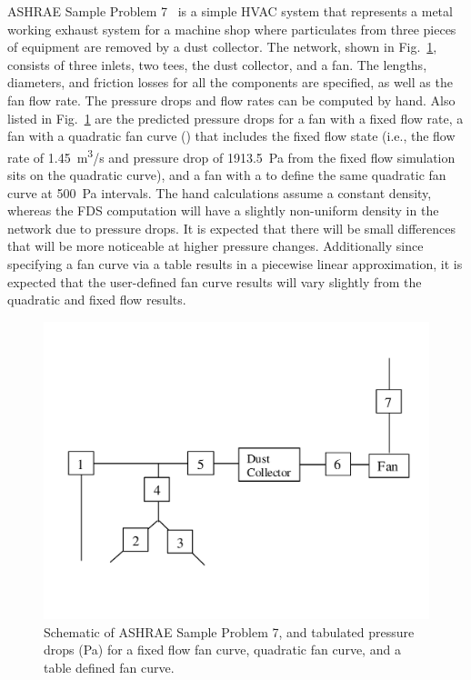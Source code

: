 \documentclass[11pt]{book}
\begin{document}
ASHRAE Sample Problem 7~\cite{ASHRAE} is a simple HVAC system that represents a metal working exhaust system for a machine shop where particulates from three pieces of equipment are removed by a dust collector.  The network, shown in Fig.~\ref{ASHRAE7}, consists of three inlets, two tees, the dust collector, and a fan.  The lengths, diameters, and friction losses for all the components are specified, as well as the fan flow rate. The pressure drops and flow rates can be computed by hand.  Also listed in Fig.~\ref{ASHRAE7} are the predicted pressure drops for a fan with a fixed flow rate, a fan with a quadratic fan curve () that includes the fixed flow state (i.e., the flow rate of 1.45~\si{m^3/s} and pressure drop of 1913.5~Pa from the fixed flow simulation sits on the quadratic curve), and a fan with a  to define the same quadratic fan curve at 500~Pa intervals. The hand calculations assume a constant density, whereas the FDS computation will have a slightly non-uniform density in the network due to pressure drops. It is expected that there will be small differences that will be more noticeable at higher pressure changes.  Additionally since specifying a fan curve via a table results in a piecewise linear approximation, it is expected that the user-defined fan curve results will vary slightly from the quadratic and fixed flow results.


\begin{figure}[ht]
\begin{center}
\includegraphics[width=4.in]{FIGURES/ashrae_7}
\end{center}
\caption[Results of  test cases]{Schematic of ASHRAE Sample Problem 7, and tabulated pressure drops (Pa) for a fixed flow fan curve, quadratic fan curve, and a table defined fan curve.}
\label{ASHRAE7}
\end{figure}
\end{document}
